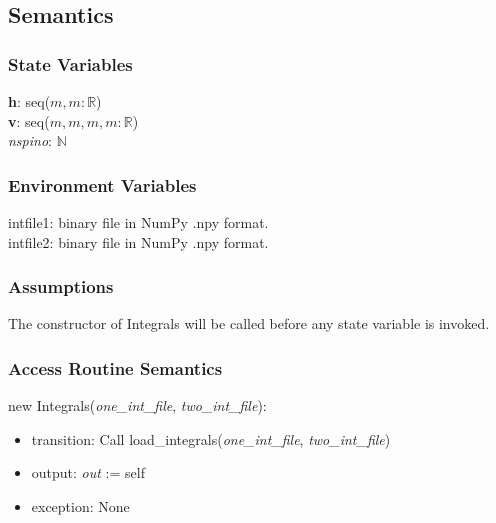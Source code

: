 \documentclass[12pt, titlepage]{article}
\begin{document}
\subsection{Semantics}

\subsubsection{State Variables}

\textbf{h}: seq($m,m:\mathbb{R}$)\\
\textbf{v}: seq($m,m,m,m:\mathbb{R}$)\\
\textit{nspino}: $\mathbb{N}$

\subsubsection{Environment Variables}

intfile1: binary file in NumPy .npy format.\\
intfile2: binary file in NumPy .npy format.

\subsubsection{Assumptions}

The constructor of Integrals will be called before any state variable is 
invoked.

\subsubsection{Access Routine Semantics}

\noindent new Integrals(\textit{one\_int\_file}, \textit{two\_int\_file}):
\begin{itemize}
	\item transition: Call load\_integrals(\textit{one\_int\_file}, 
	\textit{two\_int\_file})
	\item output: \textit{out} := self 
	\item exception: None 
\end{itemize}
\end{document}
